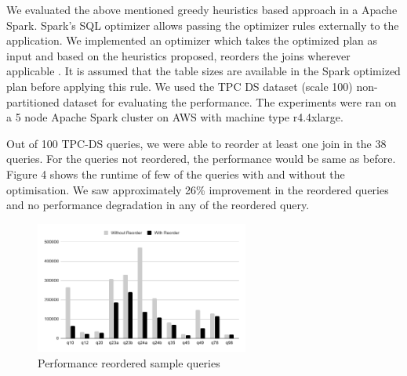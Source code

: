 We evaluated the above mentioned greedy heuristics based approach in a Apache Spark. Spark's SQL optimizer allows passing the optimizer rules externally to the application. We implemented an optimizer which takes the optimized plan as input and based on the heuristics proposed, reorders the joins wherever applicable . It is assumed that the table sizes are available in the Spark optimized plan before applying this rule. We used the TPC DS dataset (scale 100) non-partitioned dataset for evaluating the performance. The experiments were ran on a 5 node Apache Spark cluster on AWS with machine type r4.4xlarge.

Out of 100 TPC-DS queries, we were able to reorder at least one join in the 38 queries. For the queries not reordered, the performance would be same as before. Figure 4 shows the runtime of few of the queries with and without the optimisation. We saw approximately 26\% improvement in the reordered queries and no performance degradation in any of the reordered query.

\begin{figure}[ht]
\centerline{\includegraphics[width=7cm]{fig/chart.png}}
\caption{Performance reordered sample queries}
\label{performance_number}
\end{figure}